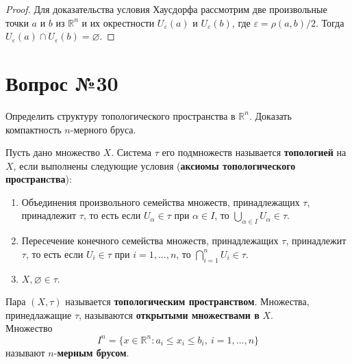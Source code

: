 \documentclass[12pt]{report}
\numberwithin{equation}{section}
\begin{document}
\begin{proof}
Для доказательства условия Хаусдорфа рассмотрим две произвольные точки $a$ и $b$ из $\mathbb{R}^n$ и их окрестности $U_{\varepsilon}(a)$ и $U_{\varepsilon}(b)$, где $\varepsilon = \rho(a,b) / 2$. Тогда $U_{\varepsilon}(a) \cap U_{\varepsilon}(b) = \varnothing$.
\end{proof}

\newpage \section{Вопрос №30} %
\begin{framed}
Определить структуру топологического пространства в $\mathbb{R}^n$. Доказать компактность $n$-мерного бруса.
\end{framed}
Пусть дано множество $X$. Система $\tau$ его подмножеств называется \textbf{топологией} на $X$, если выполнены следующие условия (\textbf{аксиомы топологического пространcтва}):
\begin{enumerate}
\item Объединения произвольного семейства множеств, принадлежащих $\tau$, принадлежит $\tau$, то есть если $U_{\alpha} \in \tau$ при $\alpha \in I$, то $\bigcup\limits_{\alpha \in I} U_{\alpha} \in \tau$. \label{ax:29:1}
\item Пересечение конечного семейства множеств, принадлежащих $\tau$, принадлежит $\tau$, то есть если $U_i \in \tau$ при $i = 1, \ldots, n$, то $\bigcap\limits_{i = 1}^n U_i \in \tau$. \label{ax:29:2}
\item $X, \varnothing \in \tau$. \label{ax:29:3}
\end{enumerate}

Пара $(X, \tau)$ называется \textbf{топологическим пространством}. Множества, принедлажащие $\tau$, называются \textbf{открытыми множествами в} $X$.\\

Множество
\[ I^n = \{ x \in \mathbb{R}^n: a_i \leqslant x_i \leqslant b_i, ~i = 1, \ldots, n \}\]
называют $n$-\textbf{мерным брусом}.
\end{document}
